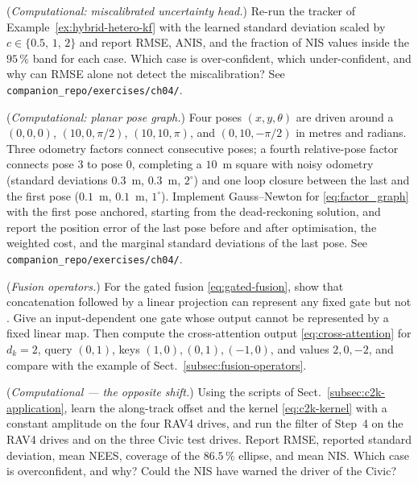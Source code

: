 \documentclass[graybox,envcountchap]{style/SNmono}
\newcommand{\repopath}[1]{\texttt{#1}}
\providecommand{\DIFadd}[1]{{\protect\color{blue} #1}} %
\providecommand{\DIFdel}[1]{{\protect\color{red} #1}} %
\providecommand{\DIFaddbegin}{} %
\providecommand{\DIFaddend}{} %
\providecommand{\DIFdelbegin}{} %
\providecommand{\DIFdelend}{} %
\begin{document}
\begin{prob}\label{prob:ch04:6}
(\emph{Computational: miscalibrated uncertainty head.}) Re-run the tracker of Example~\ref{ex:hybrid-hetero-kf} with the learned standard deviation scaled by $c\in\{0.5,\,1,\,2\}$ and report RMSE, ANIS, and the fraction of NIS values inside the $95\,\%$ band for each case. Which case is over-confident, which under-confident, and why can RMSE alone not detect the miscalibration? See \repopath{companion\_\allowbreak repo/\allowbreak exercises/\allowbreak ch04/\allowbreak }.
\end{prob}
\begin{prob}\label{prob:ch04:7}
(\emph{Computational: planar pose graph.}) Four poses $(x,y,\theta)$ are \DIFdelbegin \DIFdel{driven around a }\DIFdelend \DIFaddbegin \DIFadd{$(0,0,0)$, $(10,0,\pi/2)$, $(10,10,\pi)$, and $(0,10,-\pi/2)$ in metres and radians. Three odometry factors connect consecutive poses; a fourth relative-pose factor connects pose 3 to pose 0, completing a }\DIFaddend $10$~m square with noisy odometry (standard deviations $0.3$~m, $0.3$~m, $2^{\circ}$) and one loop closure between the last and the first pose ($0.1$~m, $0.1$~m, $1^{\circ}$). Implement Gauss--Newton for \eqref{eq:factor_graph} with the first pose anchored, starting from the dead-reckoning solution, and report the position error of the last pose before and after optimisation, the weighted cost, and the marginal standard deviations of the last pose. See \repopath{companion\_\allowbreak repo/\allowbreak exercises/\allowbreak ch04/\allowbreak }.
\end{prob}
\begin{prob}\label{prob:ch04:8}
(\emph{Fusion operators.}) For the gated fusion \eqref{eq:gated-fusion}, show that concatenation followed by a linear projection can represent any fixed gate\DIFdelbegin \DIFdel{but not }\DIFdelend \DIFaddbegin \DIFadd{. Give }\DIFaddend an input-dependent \DIFdelbegin \DIFdel{one}\DIFdelend \DIFaddbegin \DIFadd{gate whose output cannot be represented by a fixed linear map}\DIFaddend . Then compute the cross-attention output \eqref{eq:cross-attention} for $d_k=2$, query $(0,1)$, keys $(1,0),(0,1),(-1,0)$, and values $2,0,-2$, and compare with the example of Sect.~\ref{subsec:fusion-operators}.
\end{prob}

\begin{prob}\label{prob:ch04:9}
(\emph{Computational --- the opposite shift.}) Using the scripts of Sect.~\ref{subsec:c2k-application}, learn the along-track offset and the kernel \eqref{eq:c2k-kernel} with a constant amplitude on the four RAV4 drives, and run the filter of Step~4 on the RAV4 drives and on the three Civic test drives. Report RMSE, reported standard deviation, mean NEES, coverage of the $86.5\,\%$ ellipse, and mean NIS. Which case is overconfident, and why? Could the NIS have warned the driver of the Civic?
\end{prob}
\end{document}
